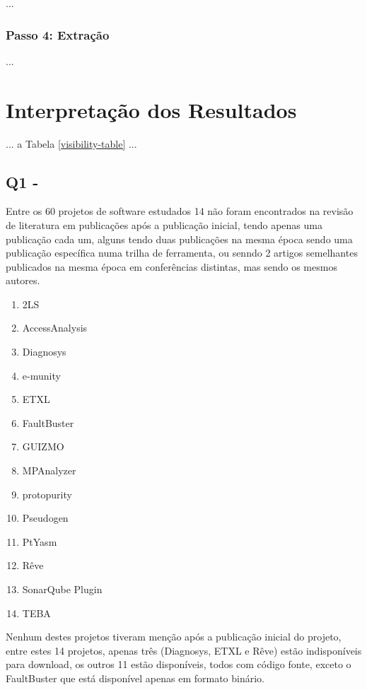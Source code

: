 ...

\subsubsection{Passo 4: Extração}

...

\section{Interpretação dos Resultados} %

... a Tabela \ref{visibility-table} ...

%

\subsection{Q1 - \EstudoDoisQuestaoUm}



Entre os 60 projetos de software estudados 14 não foram encontrados na revisão
de literatura em publicações após a publicação inicial, tendo apenas uma
publicação cada um, alguns tendo duas publicações na mesma época sendo uma
publicação específica numa trilha de ferramenta, ou senndo 2 artigos
semelhantes publicados na mesma época em conferências distintas, mas sendo os
mesmos autores.

\begin{enumerate}
  \item 2LS
  \item AccessAnalysis
  \item Diagnosys
  \item e-munity
  \item ETXL
  \item FaultBuster
  \item GUIZMO
  \item MPAnalyzer
  \item protopurity
  \item Pseudogen
  \item PtYasm
  \item Rêve
  \item SonarQube Plugin
  \item TEBA
\end{enumerate}

Nenhum destes projetos tiveram menção após a publicação inicial do projeto,
entre estes 14 projetos, apenas três (Diagnosys, ETXL e Rêve) estão
indisponíveis para download, os outros 11 estão disponíveis, todos com código
fonte, exceto o FaultBuster que está disponível apenas em formato binário.


